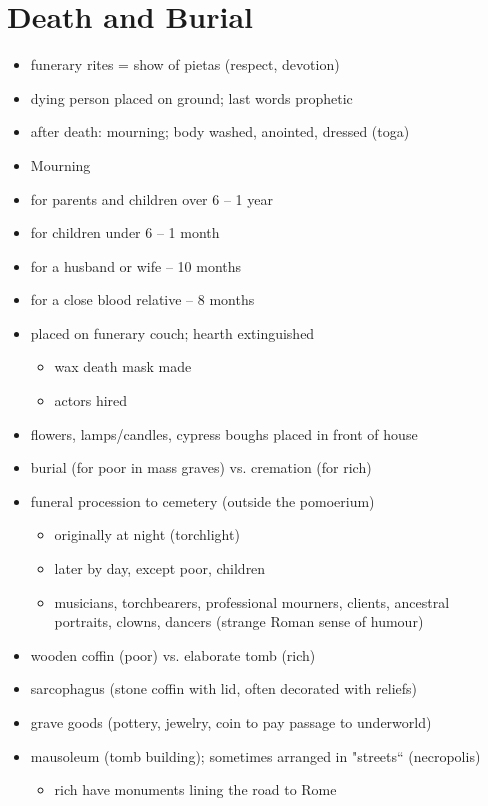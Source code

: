 \documentclass[12pt, twoside]{article}
\begin{document}
\section{Death and Burial}
\begin{itemize}
\item funerary rites = show of pietas (respect, devotion)
\item dying person placed on ground; last words prophetic
\item after death: mourning; body washed, anointed, dressed (toga)
\item Mourning
\item for parents and children over 6 – 1 year
\item for children under 6 – 1 month
\item for a husband or wife – 10 months
\item for a close blood relative – 8 months
\item placed on funerary couch; hearth extinguished
	\begin{itemize}
	\item wax death mask made
	\item actors hired
	\end{itemize}
\item flowers, lamps/candles, cypress boughs placed in front of house
\item burial (for poor in mass graves) vs. cremation (for rich)
\item funeral procession to cemetery (outside the pomoerium)
	\begin{itemize}
	\item originally at night (torchlight)
	\item later by day, except poor, children
	\item musicians, torchbearers, professional mourners, clients, ancestral portraits, clowns, dancers (strange Roman sense of humour)
	\end{itemize}
\item wooden coffin (poor) vs. elaborate tomb (rich)
\item sarcophagus (stone coffin with lid, often decorated with reliefs)
\item grave goods (pottery, jewelry, coin to pay passage to underworld)
\item mausoleum (tomb building); sometimes arranged in "streets“ (necropolis)
	\begin{itemize}
	\item rich have monuments lining the road to Rome

\end{itemize}
\end{itemize}
\end{document}
